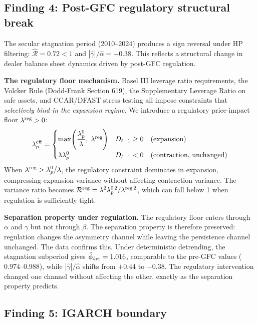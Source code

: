 \documentclass[12pt,a4paper]{article}
\theoremstyle{definition}
\begin{document}
\subsection{Finding 4: Post-GFC regulatory structural break}
\label{sec:finding4}

The secular stagnation period (2010--2024) produces a sign reversal
under HP filtering: $\hat{\mathcal{R}} = 0.72 < 1$ and
$|\hat{\gamma}|/\hat{\alpha} = -0.38$. This reflects a structural
change in dealer balance sheet dynamics driven by post-GFC regulation.

\noindent\textbf{The regulatory floor mechanism.} Basel III leverage
ratio requirements, the Volcker Rule (Dodd-Frank Section 619), the
Supplementary Leverage Ratio on safe assets, and CCAR/DFAST stress
testing all impose constraints that \emph{selectively bind in the
expansion regime}. We introduce a regulatory price-impact floor
$\lambda^{\rm reg} > 0$:
\begin{equation}
  \lambda^{\rm eff}_p =
  \begin{cases}
    \max\!\left(\dfrac{\lambda^0_p}{\lambda},\; \lambda^{\rm reg}\right)
      & D_{t-1} \geq 0 \quad\text{(expansion)} \\[8pt]
    \lambda\lambda^0_p
      & D_{t-1} < 0 \quad\text{(contraction, unchanged)}
  \end{cases}
  \label{eq:reg_floor}
\end{equation}
When $\lambda^{\rm reg} > \lambda^0_p/\lambda$, the regulatory
constraint dominates in expansion, compressing expansion variance
without affecting contraction variance. The variance ratio becomes
$\mathcal{R}^{\rm reg} = \lambda^2\lambda^{0\,2}_p /
\lambda^{\rm reg\,2}$, which can fall below 1 when regulation is
sufficiently tight.

\noindent\textbf{Separation property under regulation.} The regulatory
floor enters through $\alpha$ and $\gamma$ but not through $\beta$.
The separation property is therefore preserved: regulation changes the
asymmetry channel while leaving the persistence channel unchanged.
The data confirms this. Under deterministic detrending, the stagnation
subperiod gives $\hat{\phi}_{\rm det} = 1.016$, comparable to the
pre-GFC values ($0.974$--$0.988$), while $|\hat{\gamma}|/\hat{\alpha}$
shifts from $+0.44$ to $-0.38$. The regulatory intervention changed
one channel without affecting the other, exactly as the separation
property predicts.

\subsection{Finding 5: IGARCH boundary}
\label{sec:finding5}
\end{document}

